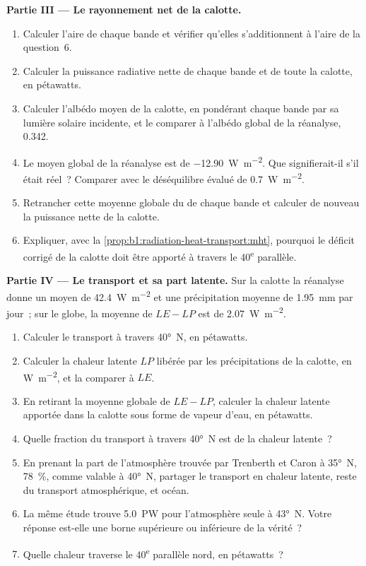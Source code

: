 \begin{problem}
\medskip
\noindent\textbf{Partie III --- Le rayonnement net de la calotte.}
\begin{enumerate}[resume]
  \item Calculer l'aire de chaque bande et vérifier qu'elles s'additionnent à l'aire de
        la question~6.
  \item Calculer la puissance radiative nette de chaque bande et de toute la calotte, en
        pétawatts.
  \item Calculer l'albédo moyen de la calotte, en pondérant chaque bande par sa
        lumière solaire incidente, et le comparer à l'albédo global de la réanalyse, \num{0.342}.
  \item Le  moyen global de la réanalyse est de \qty{-12.90}{W.m^{-2}}. Que
        signifierait-il s'il était réel~? Comparer avec le déséquilibre évalué de
        \qty{+0.7}{W.m^{-2}}.
  \item Retrancher cette moyenne globale du  de chaque bande et calculer
        de nouveau la puissance nette de la calotte.
  \item Expliquer, avec la \cref{prop:b1:radiation-heat-transport:mht}, pourquoi le
        déficit corrigé de la calotte doit être apporté à travers le 40\textsuperscript{e} parallèle.
\end{enumerate}

\medskip
\noindent\textbf{Partie IV --- Le transport et sa part latente.} Sur la calotte la
réanalyse donne un  moyen de \qty{42.4}{W.m^{-2}} et une
précipitation moyenne de \qty{1.95}{mm} par jour~; sur le globe, la moyenne de $LE - LP$ est de
\qty{2.07}{W.m^{-2}}.
\begin{enumerate}[resume]
  \item Calculer le transport à travers \ang{40}~N, en pétawatts.
  \item Calculer la chaleur latente $LP$ libérée par les précipitations de la calotte, en
        \unit{W.m^{-2}}, et la comparer à $LE$.
  \item En retirant la moyenne globale de $LE - LP$, calculer la chaleur latente apportée dans
        la calotte sous forme de vapeur d'eau, en pétawatts.
  \item Quelle fraction du transport à travers \ang{40}~N est de la chaleur latente~?
  \item En prenant la part de l'atmosphère trouvée par Trenberth et Caron à \ang{35}~N,
        \qty{78}{\percent}, comme valable à \ang{40}~N, partager le transport en
        chaleur latente, reste du transport atmosphérique, et océan.
  \item La même étude trouve \qty{5.0}{PW} pour l'atmosphère seule à
        \ang{43}~N. Votre réponse est-elle une borne supérieure ou inférieure de la vérité~?
  \item Quelle chaleur traverse le 40\textsuperscript{e} parallèle nord, en pétawatts~?
\end{enumerate}
\end{problem}
